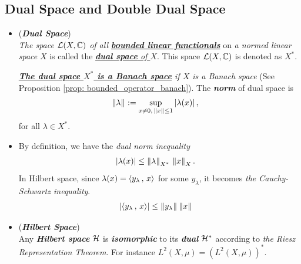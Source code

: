 \documentclass[11pt]{article}
\begin{document}
\subsection{Dual Space and Double Dual Space}
\begin{itemize}
\item \begin{definition} (\emph{\textbf{Dual Space}})\\
\emph{The space ${\mathcal L}(X, {\mathbb C})$ of all \underline{\textbf{bounded linear functionals}}} on \emph{a normed linear space} $X$ is called the \underline{\emph{\textbf{dual space} of $X$}}. This space ${\mathcal L}(X, {\mathbb C})$ is denoted as $X^{*}$.

\emph{\underline{\textbf{The dual space $X^{*}$ is a Banach space}} if $X$ is a Banach space} (See Proposition \ref{prop: bounded_operator_banach}). The \emph{\textbf{norm}} of dual space is 
\begin{align*}
\left\|\lambda\right\|_{} &:= \sup_{x \neq 0, \, \left\|x\right\|_{} \le 1} \left\lvert \lambda(x) \right\rvert,
\end{align*} for all $\lambda \in X^{*}$.
\end{definition}

\item \begin{remark}
By definition, we have the \emph{dual norm inequality} 
\begin{align}
\left\lvert \lambda(x) \right\rvert &\le \left\|\lambda\right\|_{X^{*}}\,\left\|x\right\|_{X}. \label{eqn: dual_norm_inequality}
\end{align} In Hilbert space, since $\lambda(x) = \left\langle y_{\lambda}\,,\, x \right\rangle$ for some $y_{\lambda}$, it becomes \emph{the Cauchy-Schwartz inequality}.
\begin{align*}
\left\lvert \left\langle y_{\lambda}\,,\, x \right\rangle \right\rvert &\le \left\|y_{\lambda}\right\|_{}\left\|x\right\|_{}
\end{align*}
\end{remark}

\item \begin{example} (\textbf{\emph{Hilbert Space}})\\
Any \emph{\textbf{Hilbert space}} ${\mathcal H}$ is \emph{\textbf{isomorphic}} to its \emph{\textbf{dual}} ${\mathcal H}^{*}$ according to \emph{the Riesz Representation Theorem}. For instance $L^2(X, \mu) = (L^2(X, \mu))^{*}$.
\end{example}


\end{itemize}
\end{document}
